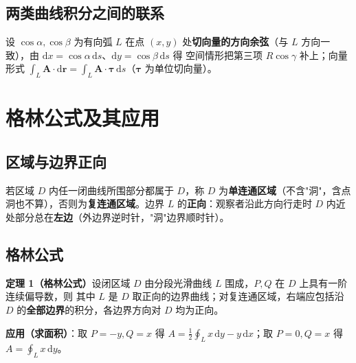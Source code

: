 
\subsection{两类曲线积分之间的联系}

设 $\cos\alpha,\cos\beta$ 为有向弧 $L$ 在点 $(x,y)$ 处\textbf{切向量的方向余弦}（与 $L$ 方向一致），由 $\mathrm{d}x=\cos\alpha\,\mathrm{d}s$、$\mathrm{d}y=\cos\beta\,\mathrm{d}s$ 得
空间情形把第三项 $R\cos\gamma$ 补上；向量形式 $\int_L\boldsymbol A\cdot\mathrm{d}\boldsymbol r=\int_L\boldsymbol A\cdot\boldsymbol\tau\,\mathrm{d}s$（$\boldsymbol\tau$ 为单位切向量）。


\section{格林公式及其应用}
\subsection{区域与边界正向}

若区域 $D$ 内任一闭曲线所围部分都属于 $D$，称 $D$ 为\textbf{单连通区域}（不含"洞"，含点洞也不算），否则为\textbf{复连通区域}。边界 $L$ 的\textbf{正向}：观察者沿此方向行走时 $D$ 内近处部分总在\textbf{左边}（外边界逆时针，"洞"边界顺时针）。

\subsection{格林公式}

\textbf{定理 1（格林公式）}\quad 设闭区域 $D$ 由分段光滑曲线 $L$ 围成，$P,Q$ 在 $D$ 上具有一阶连续偏导数，则
其中 $L$ 是 $D$ 取正向的边界曲线；对复连通区域，右端应包括沿 $D$ 的\textbf{全部边界}的积分，各边界方向对 $D$ 均为正向。

\textbf{应用（求面积）}：取 $P=-y,Q=x$ 得 $A=\frac{1}{2}\oint_Lx\,\mathrm{d}y-y\,\mathrm{d}x$；取 $P=0,Q=x$ 得 $A=\oint_Lx\,\mathrm{d}y$。

